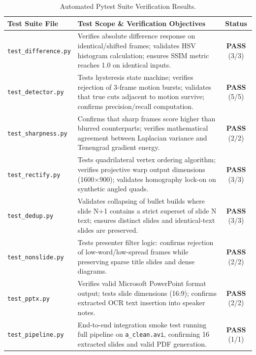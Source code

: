 \documentclass[10pt,a4paper]{article}
\begin{document}
\begin{table}[h!]
\small
\centering
\begin{tabularx}{\textwidth}{@{} p{44mm} X c @{}}
\toprule
\rowcolor{navy}\color{white}\textbf{Test Suite File} & \color{white}\textbf{Test Scope \& Verification Objectives} & \color{white}\textbf{Status} \\
\midrule
\texttt{test\_difference.py} & Verifies absolute difference response on identical/shifted frames; validates HSV histogram calculation; ensures SSIM metric reaches 1.0 on identical inputs. & \textbf{PASS} (3/3) \\
\texttt{test\_detector.py} & Tests hysteresis state machine; verifies rejection of 3-frame motion bursts; validates that true cuts adjacent to motion survive; confirms precision/recall computation. & \textbf{PASS} (5/5) \\
\texttt{test\_sharpness.py} & Confirms that sharp frames score higher than blurred counterparts; verifies mathematical agreement between Laplacian variance and Tenengrad gradient energy. & \textbf{PASS} (2/2) \\
\texttt{test\_rectify.py} & Tests quadrilateral vertex ordering algorithm; verifies projective warp output dimensions (1600$\times$900); validates homography lock-on on synthetic angled quads. & \textbf{PASS} (3/3) \\
\texttt{test\_dedup.py} & Validates collapsing of bullet builds where slide N+1 contains a strict superset of slide N text; ensures distinct slides and identical-text slides are preserved. & \textbf{PASS} (3/3) \\
\texttt{test\_nonslide.py} & Tests presenter filter logic: confirms rejection of low-word/low-spread frames while preserving sparse title slides and dense diagrams. & \textbf{PASS} (2/2) \\
\texttt{test\_pptx.py} & Verifies valid Microsoft PowerPoint format output; tests slide dimensions (16:9); confirms extracted OCR text insertion into speaker notes. & \textbf{PASS} (2/2) \\
\texttt{test\_pipeline.py} & End-to-end integration smoke test running full pipeline on \texttt{a\_clean.avi}, confirming 16 extracted slides and valid PDF generation. & \textbf{PASS} (1/1) \\
\bottomrule
\end{tabularx}
\caption{Automated Pytest Suite Verification Results.}
\end{table}

\end{document}

